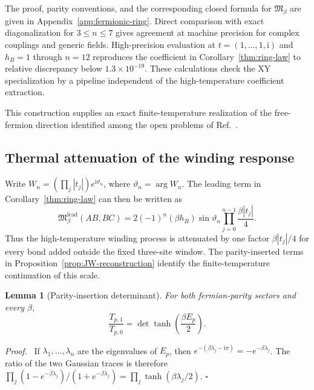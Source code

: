 \documentclass[aps,prb,preprint,nofootinbib,longbibliography]{revtex4-2}
\newcommand{\Mmod}{\mathfrak{M}}
\newcommand{\ii}{\mathrm{i}}
\newtheorem{lemma}[theorem]{Lemma}
\newenvironment{proof}{\par\noindent\textit{Proof.}\ }%
{\unskip\nobreak\hfill\(\square\)\par}
\begin{document}
The proof, parity conventions, and the corresponding closed formula for
$\Mmod_\beta$ are given in Appendix~\ref{app:fermionic-ring}.  Direct
comparison with exact diagonalization for $3\le n\le7$ gives agreement at
machine precision for complex couplings and generic fields.  High-precision
evaluation at $t=(1,\ldots,1,\ii)$ and $h_B=1$ through $n=12$ reproduces the
coefficient in Corollary~\ref{thm:ring-law} to relative discrepancy below
$1.3\times10^{-19}$.  These calculations check the XY specialization by a
pipeline independent of the high-temperature coefficient extraction.

This construction supplies an exact finite-temperature realization of the
free-fermion direction identified among the open problems of
Ref.~\cite{KimEtAl2022PRB}.

\subsection{Thermal attenuation of the winding response}
\label{sec:ring-attenuation}

Write $W_n=(\prod_j|t_j|)e^{\ii\vartheta_n}$, where
$\vartheta_n=\arg W_n$.  The leading term in
Corollary~\ref{thm:ring-law} can then be written as
\begin{equation}
 \Mmod_\beta^{\mathrm{lead}}(AB,BC)
 =2(-1)^n(\beta h_B)\sin\vartheta_n
 \prod_{j=0}^{n-1}\frac{\beta|t_j|}{4}.
 \label{eq:ring-product-form}
\end{equation}
Thus the high-temperature winding process is attenuated by one factor
$\beta|t_j|/4$ for every bond added outside the fixed three-site window.
The parity-inserted terms in Proposition~\ref{prop:JW-reconstruction}
identify the finite-temperature continuation of this scale.

\begin{lemma}[Parity-insertion determinant]
\label{lem:parity-determinant}
For both fermion-parity sectors and every $\beta$,
\begin{equation}
 \frac{T_{p,1}}{T_{p,0}}
 =\det\tanh\!\left(\frac{\beta E_p}{2}\right).
 \label{eq:parity-determinant}
\end{equation}
\end{lemma}

\begin{proof}
If $\lambda_1,\ldots,\lambda_n$ are the eigenvalues of $E_p$, then
$e^{-(\beta\lambda_j-\ii\pi)}=-e^{-\beta\lambda_j}$.  The ratio of the
two Gaussian traces is therefore
$\prod_j(1-e^{-\beta\lambda_j})/(1+e^{-\beta\lambda_j})
=\prod_j\tanh(\beta\lambda_j/2)$.
\end{proof}
\end{document}
